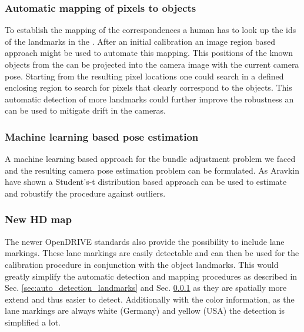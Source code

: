 \subsubsection{Automatic mapping of pixels to objects}
\label{sec:auto_mapping_landmarks}
To establish the mapping of the correspondences a human has to look up the ids of the landmarks in the \HDmaps{}.
After an initial calibration an image region based approach might be used to automate this mapping.
This positions of the known objects from the \HDmaps{} can be projected into the camera image with the current camera pose.
Starting from the resulting pixel locations one could search in a defined enclosing region to search for pixels that clearly correspond to the objects.
This automatic detection of more landmarks could further improve the robustness an can be used to mitigate drift in the cameras.  

\subsubsection{Machine learning based pose estimation}
A machine learning based approach for the bundle adjustment problem we faced and the resulting camera pose estimation problem can be formulated.
As Aravkin \etal \cite{students_t_bundle_adjustment} have shown a Student's-t distribution based approach can be used to estimate and robustify the procedure against outliers.
  
\subsubsection{New HD map}
The newer OpenDRIVE standards also provide the possibility to include lane markings.
These lane markings are easily detectable and can then be used for the calibration procedure in conjunction with the object landmarks.
This would greatly simplify the automatic detection and mapping procedures as described in Sec. \ref{sec:auto_detection_landmarks} and Sec. \ref{sec:auto_mapping_landmarks} as they are spatially more extend and thus easier to detect.
Additionally with the color information, as the lane markings are always white (Germany) and yellow (USA) the detection is simplified a lot.